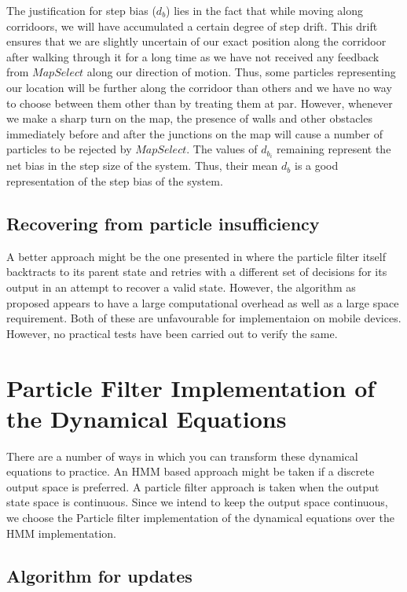 The justification for step bias ($d_b$) lies in the fact that while
moving along corridoors, we will have accumulated
a certain degree of step drift. This drift ensures that we are slightly 
uncertain of our exact position along the corridoor after walking through it for a long time
as we have not received any feedback from $MapSelect$ along our direction of motion. 
Thus,
some particles representing our location will be further along the corridoor than others and we have no way 
to choose between them other than by treating them at par. However, 
whenever we make a sharp turn on the map, the presence of walls and other 
obstacles immediately before and after the junctions on the map will cause 
a number of particles to be rejected by $MapSelect$. The values of $d_{b_i}$
remaining represent the net bias in the step size of the system. Thus,
their mean $d_b$ is a good representation of the step bias of the system.

\subsection{Recovering from particle insufficiency}

A better approach might be the one presented in \cite{Widyawan} where the particle 
filter itself backtracts to its parent state and retries with a different 
set of decisions for its output in an attempt to recover a valid state. However, 
the algorithm as proposed appears to have a large computational overhead as well
as a large space requirement. Both of these are unfavourable for implementaion
on mobile devices. However, no practical tests have been carried out to verify
the same.

\section{Particle Filter Implementation of the Dynamical Equations}

There are a number of ways in which you can transform these dynamical 
equations to practice. An HMM based approach might be taken if a discrete
output space is preferred. A particle filter approach is taken when the 
output state space is continuous. Since we intend to keep the output space
continuous, we choose the Particle filter implementation of the dynamical
equations over the HMM implementation.

\subsection{Algorithm for updates}

